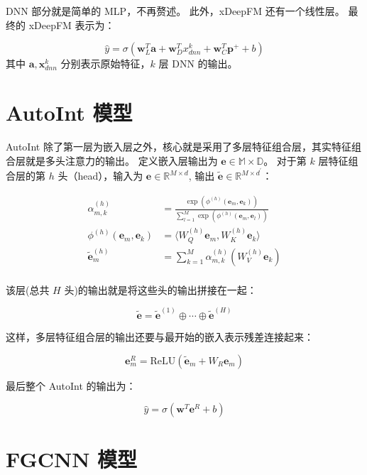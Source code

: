 \documentclass[degree=project,degree-type=project,cjk-font=noto]{thuthesis}
\begin{document}
DNN 部分就是简单的 MLP，不再赘述。
此外，xDeepFM 还有一个线性层。
最终的 xDeepFM 表示为：

\begin{equation}
  \hat{y} = \sigma(\bm{w}_L^T \bm{a} + \bm{w}_D^T x^k_{dnn} + \bm{w}_C^T \bm{p}^+ + b)
\end{equation}
其中 $\bm{a}, \bm{x}^k_{dnn}$ 分别表示原始特征，$k$ 层 DNN 的输出。

\section{AutoInt 模型}
\label{sec:autoint}

AutoInt 除了第一层为嵌入层之外，核心就是采用了多层特征组合层，其实特征组合层就是多头注意力的输出。
定义嵌入层输出为 $\bm{e} \in \mathbb{M \times D}$。
对于第 $k$ 层特征组合层的第 $h$ 头（head），输入为 $\bm{e} \in \mathbb{R}^{M \times d}$, 输出 $\tilde{\bm{e}} \in \mathbb{R}^{M \times d^\prime}$：

\begin{align}
  \alpha_{m,k}^{(h)} &= \frac{\exp(\phi^{(h)}(\bm{e}_m, \bm{e}_k))}{\sum_{l=1}^M \exp(\phi^{(h)}(\bm{e}_m, \bm{e}_l))} \\
  \phi^{(h)}(\bm{e}_m, \bm{e}_k) &= \langle W_Q^{(h)} \bm{e}_m, W_K^{(h)} \bm{e}_k\rangle \\
  \tilde{\bm{e}}_m^{(h)} &= \sum_{k=1}^M \alpha_{m,k}^{(h)} (W_V^{(h)} \bm{e}_k) \\
\end{align}

该层(总共 $H$ 头)的输出就是将这些头的输出拼接在一起：

\begin{equation}
  \tilde{\bm{e}} = \tilde{\bm{e}}^{(1)} \oplus \cdots \oplus \tilde{\bm{e}}^{(H)}
\end{equation}

这样，多层特征组合层的输出还要与最开始的嵌入表示残差连接起来：

\begin{equation}
  \bm{e}^{R}_m = \text{ReLU}(\tilde{\bm{e}}_m + W_R \bm{e}_m)
\end{equation}

最后整个 AutoInt 的输出为：

\begin{equation}
  \hat{y} = \sigma(\bm{w}^T \bm{e}^R + b)
\end{equation}

\section{FGCNN 模型}
\label{sec:fgcnn}
\end{document}
